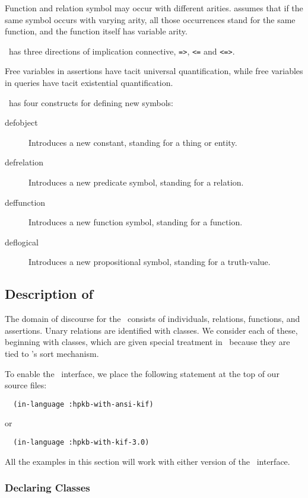 Function and relation symbol may occur with different arities.
\kif\/ assumes that if the same symbol occurs with varying arity, all those
occurrences stand for the same function, and the function itself has
variable arity.

\Kif\  has three directions of implication connective, \verb'=>', \verb'<='
and \verb'<=>'.

Free variables in assertions have tacit universal quantification,
while free variables in queries have tacit existential quantification.

\Kif\  has four constructs for defining new symbols:

\begin{description}
 \item[defobject] Introduces a new constant, standing for a thing or entity.

 \item[defrelation] Introduces a new predicate symbol, standing for a
 relation.

 \item[deffunction] Introduces a new function symbol, standing for a
 function.

 \item[deflogical]  Introduces a new propositional symbol, standing for a
 truth-value.
\end{description}



\subsection{Description of \kifsnark}

The domain of discourse for the \kifsnark\  consists of individuals,
relations, functions, and assertions.  Unary relations are identified with
classes.  We consider each of these, beginning with classes, which are given
special treatment in \kifsnark\  because they are tied to \snark\/'s sort
mechanism.

To enable the \kifsnark\  interface, we place the following statement
at the top of our source files:
\begin{verbatim}
  (in-language :hpkb-with-ansi-kif)
\end{verbatim}
or
\begin{verbatim}
  (in-language :hpkb-with-kif-3.0)
\end{verbatim}
All the examples in this section will work with either version of the \kif\
interface.


\subsubsection{Declaring Classes}
\label{subsec-kif-class}

